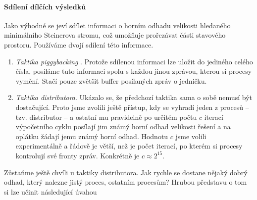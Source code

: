 \documentclass[12pt]{article}
\theoremstyle{definition}
\begin{document}
\paragraph{Sdílení dílčích výsledků}
Jako výhodné se jeví sdílet informaci o horním odhadu velikosti hledaného minimálního Steinerova stromu, což umožňuje prořezávat části stavového prostoru. Používáme dvojí sdílení této
informace.
\begin{enumerate}
	\item \emph{Taktika piggybacking	}. Protože sdílenou informaci lze uložit do jediného celého čísla, posíláme tuto informaci spolu s každou jinou zprávou, kterou si procesy vymění. Stačí pouze zvětšit buffer posílaných zpráv o jedničku.
	\item \emph{Taktika distributora}. Ukázalo se, že předchozí taktika sama o sobě nemusí být dostačující. Proto jsme zvolili ještě přístup, kdy se vyhradí jeden z procesů -- tzv. distributor --  a ostatní mu pravidelně po určitém počtu $c$ iterací výpočetního cyklu posílají jim známý horní odhad velikosti řešení a na oplátku žádají jemu známý horní odhad. Hodnotu $c$ jsme volili experimentálně a řádově je větší, než je počet iterací, po kterém
	si procesy kontrolují své fronty zpráv. Konkrétně je $c\approx 2^{15}$.
\end{enumerate}
Zůstaňme ještě chvíli u taktiky distributora. Jak rychle se dostane nějaký dobrý odhad,
který nalezne jistý proces, ostatním procesům? Hrubou představu o tom
si lze učinit následující úvahou
\end{document}
